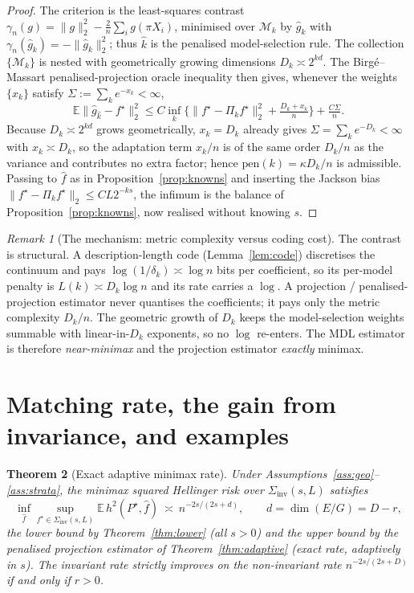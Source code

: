 \documentclass[11pt]{article}
\theoremstyle{plain}
\newtheorem{theorem}{Theorem}[section]
\theoremstyle{definition}
\theoremstyle{remark}
\newtheorem{remark}[theorem]{Remark}
\newcommand{\E}{\mathbb{E}}
\newcommand{\Siv}{\Sigma_{\mathrm{inv}}}
\DeclareMathOperator{\dimm}{dim}
\begin{document}
\begin{proof}
The criterion is the least-squares contrast
$\gamma_n(g)=\|g\|_2^2-\tfrac2n\sum_i g(\pi X_i)$, minimised over $\mathcal M_k$ by
$\widehat g_k$ with $\gamma_n(\widehat g_k)=-\|\widehat g_k\|_2^2$; thus $\widehat k$
is the penalised model-selection rule. The collection $\{\mathcal M_k\}$ is nested
with geometrically growing dimensions $D_k\asymp2^{kd}$. The Birg\'e--Massart
penalised-projection oracle inequality \cite{birgemassart98,massart} then gives,
whenever the weights $\{x_k\}$ satisfy $\Sigma:=\sum_k e^{-x_k}<\infty$,
\[
\E\|\widehat g_{\widehat k}-f^\star\|_2^2\le C\inf_k\Big\{\|f^\star-\Pi_kf^\star\|_2^2+\tfrac{D_k+x_k}n\Big\}+\tfrac{C\Sigma}n .
\]
Because $D_k\asymp2^{kd}$ grows geometrically, $x_k=D_k$ already gives
$\Sigma=\sum_k e^{-D_k}<\infty$ with $x_k\asymp D_k$, so the adaptation term $x_k/n$
is of the same order $D_k/n$ as the variance and contributes no extra factor; hence
$\mathrm{pen}(k)=\kappa D_k/n$ is admissible. Passing to $\widehat f$ as in
Proposition~\ref{prop:knowns} and inserting the Jackson bias
$\|f^\star-\Pi_kf^\star\|_2\le CL2^{-ks}$, the infimum is the balance of
Proposition~\ref{prop:knowns}, now realised without knowing $s$.
\end{proof}

\begin{remark}[The mechanism: metric complexity versus coding cost]\label{rem:mechanism}
The contrast is structural. A description-length code (Lemma~\ref{lem:code})
discretises the continuum and pays $\log(1/\delta_k)\asymp\log n$ bits per
coefficient, so its per-model penalty is $L(k)\asymp D_k\log n$ and its rate carries
a $\log$. A projection / penalised-projection estimator never quantises the
coefficients; it pays only the metric complexity $D_k/n$. The geometric growth of
$D_k$ keeps the model-selection weights summable with linear-in-$D_k$ exponents, so
no $\log$ re-enters. The MDL estimator is therefore \emph{near-minimax} and the
projection estimator \emph{exactly} minimax.
\end{remark}

\section{Matching rate, the gain from invariance, and examples}\label{sec:main}

\begin{theorem}[Exact adaptive minimax rate]\label{thm:main}
Under Assumptions~\ref{ass:geo}--\ref{ass:strata}, the minimax squared Hellinger
risk over $\Siv(s,L)$ satisfies
\[
\boxed{\ \inf_{\widehat f}\sup_{f^\star\in\Siv(s,L)}\E\,h^2(P^\star,\widehat f)\ \asymp\ n^{-2s/(2s+d)},\qquad d=\dimm(E/G)=D-r,\ }
\]
the lower bound by Theorem~\ref{thm:lower} (all $s>0$) and the upper bound by the
penalised projection estimator of Theorem~\ref{thm:adaptive} (exact rate,
adaptively in $s$). The invariant rate strictly improves on the non-invariant rate
$n^{-2s/(2s+D)}$ if and only if $r>0$.
\end{theorem}
\end{document}
